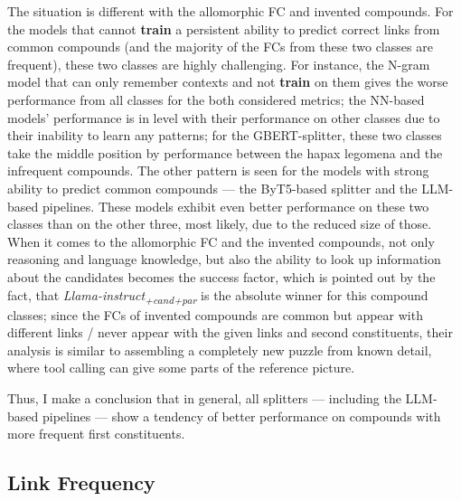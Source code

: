 \documentclass[11pt]{article}
\begin{document}
The situation is different with the allomorphic FC and invented compounds. For the models that cannot \textbf{train} a persistent ability to predict correct links from common compounds (and the majority of the FCs from these two classes are frequent), these two classes are highly challenging. For instance, the N-gram model that can only remember contexts and not \textbf{train} on them gives the worse performance from all classes for the both considered metrics; the NN-based models' performance is in level with their performance on other classes due to their inability to learn any patterns; for the GBERT-splitter, these two classes take the middle position by performance between the hapax legomena and the infrequent compounds. The other pattern is seen for the models with strong ability to predict common compounds --- the ByT5-based splitter and the LLM-based pipelines. These models exhibit even better performance on these two classes than on the other three, most likely, due to the reduced size of those. When it comes to the allomorphic FC and the invented compounds, not only reasoning and language knowledge, but also the ability to look up information about the candidates becomes the success factor, which is pointed out by the fact, that \textit{Llama-instruct\textsubscript{+cand+par}} is the absolute winner for this compound classes; since the FCs of invented compounds are common but appear with different links / never appear with the given links and second constituents, their analysis is similar to assembling a completely new puzzle from known detail, where tool calling can give some parts of the reference picture.

Thus, I make a conclusion that in general, all splitters --- including the LLM-based pipelines --- show a tendency of better performance on compounds with more frequent first constituents.


\subsection{Link Frequency}
\end{document}
